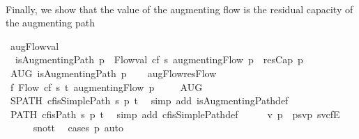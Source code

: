 \begin{isabellebody}
\ \ \isacommand{{\isacharbraceright}}\isamarkupfalse%
\isanewline
{}\isamarkupfalse%
%
\endisatagproof
{\isafoldproof}%
%
\isadelimproof
%
\endisadelimproof
%
\isamarkuptrue%
%
\begin{isamarkuptext}%
Finally, we show that the value of the augmenting flow is the residual 
  capacity of the augmenting path%
\end{isamarkuptext}\isamarkuptrue%
\isamarkupfalse%
\ augFlow{\isacharunderscore}val{\isacharcolon}\ \isanewline
\ \ {\isachardoublequoteopen}isAugmentingPath\ p\ {\isasymLongrightarrow}\ Flow{\isachardot}val\ cf\ s\ {\isacharparenleft}augmentingFlow\ p{\isacharparenright}\ {\isacharequal}\ resCap\ p{\isachardoublequoteclose}\isanewline
%
\isadelimproof
%
\endisadelimproof
%
\isatagproof
{}\isamarkupfalse%
\ {\isacharminus}\isanewline
\ \ \isamarkupfalse%
\ AUG{\isacharcolon}\ {\isachardoublequoteopen}isAugmentingPath\ p{\isachardoublequoteclose}\isanewline
\ \ \isamarkupfalse%
\ augFlow{\isacharunderscore}resFlow\ \isamarkupfalse%
\ f{\isacharcolon}\ Flow\ cf\ s\ t\ {\isachardoublequoteopen}augmentingFlow\ p{\isachardoublequoteclose}\ \isacommand{{\isachardot}}\isamarkupfalse%
\isanewline
\isanewline
\ \ \isamarkupfalse%
\ AUG\ \isanewline
\ \ \isamarkupfalse%
\ SPATH{\isacharcolon}\ {\isachardoublequoteopen}cf{\isachardot}isSimplePath\ s\ p\ t{\isachardoublequoteclose}\ \isamarkupfalse%
\ {\isacharparenleft}simp\ add{\isacharcolon}\ isAugmentingPath{\isacharunderscore}def{\isacharparenright}\isanewline
\ \ \isamarkupfalse%
\ PATH{\isacharcolon}\ {\isachardoublequoteopen}cf{\isachardot}isPath\ s\ p\ t{\isachardoublequoteclose}\ \isamarkupfalse%
\ {\isacharparenleft}simp\ add{\isacharcolon}\ cf{\isachardot}isSimplePath{\isacharunderscore}def{\isacharparenright}\isanewline
\ \ \isamarkupfalse%
\ \isamarkupfalse%
\ v\ p{\isacharprime}\ \ {\isachardoublequoteopen}p{\isacharequal}{\isacharparenleft}s{\isacharcomma}v{\isacharparenright}{\isacharhash}p{\isacharprime}{\isachardoublequoteclose}\ {\isachardoublequoteopen}{\isacharparenleft}s{\isacharcomma}v{\isacharparenright}{\isasymin}cf{\isachardot}E{\isachardoublequoteclose}\ \isanewline
\ \ \ \ \isamarkupfalse%
\ s{\isacharunderscore}not{\isacharunderscore}t\ \isamarkupfalse%
\ {\isacharparenleft}cases\ p{\isacharparenright}\ auto\isanewline

\end{isabellebody}
